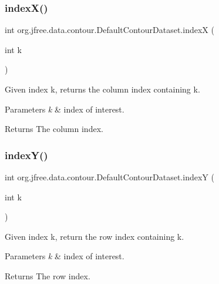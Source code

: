 \subsubsection{\texorpdfstring{index\+X()}{indexX()}\hspace{0.1cm}{\footnotesize\ttfamily [2/2]}}
{\footnotesize\ttfamily int org.\+jfree.\+data.\+contour.\+Default\+Contour\+Dataset.\+indexX (\begin{DoxyParamCaption}\item[{int}]{k }\end{DoxyParamCaption})}

Given index k, returns the column index containing k.


\begin{DoxyParams}{Parameters}
{\em k} & index of interest.\\
\hline
\end{DoxyParams}
\begin{DoxyReturn}{Returns}
The column index. 
\end{DoxyReturn}
\mbox{\label{classorg_1_1jfree_1_1data_1_1contour_1_1_default_contour_dataset_a02cb72764674f73faec5ba7574877098}} 
\subsubsection{\texorpdfstring{index\+Y()}{indexY()}}
{\footnotesize\ttfamily int org.\+jfree.\+data.\+contour.\+Default\+Contour\+Dataset.\+indexY (\begin{DoxyParamCaption}\item[{int}]{k }\end{DoxyParamCaption})}

Given index k, return the row index containing k.


\begin{DoxyParams}{Parameters}
{\em k} & index of interest.\\
\hline
\end{DoxyParams}
\begin{DoxyReturn}{Returns}
The row index. 
\end{DoxyReturn}
\mbox{\label{classorg_1_1jfree_1_1data_1_1contour_1_1_default_contour_dataset_af469d3341c6f25053e4bfde103746620}} 
